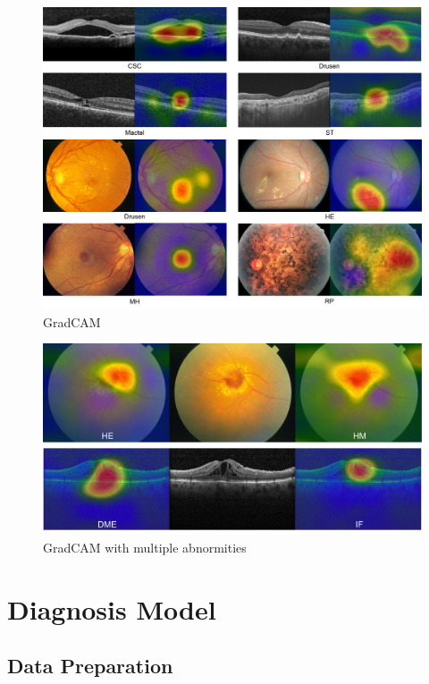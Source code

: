 \documentclass{article}
\begin{document}
	\begin{figure}[htbp]
		\centering
		\includegraphics[width=\linewidth]{Figs/abnormity_gradCAM.pdf}
		\caption{GradCAM}
		\vspace{0.3cm}
		\label{fig:gradCAM}
	\end{figure}
	
	\begin{figure}[htbp]
		\centering
		\includegraphics[width=0.8\linewidth]{Figs/abnormity_gradCAM_multiple_abnormities.pdf}
		\caption{GradCAM with multiple abnormities}
		\vspace{0.3cm}
		\label{fig:gradCAM_multi_abnormity}
	\end{figure}
	
	\section{Diagnosis Model}
	
	\subsection{Data Preparation}
	
\end{document}
